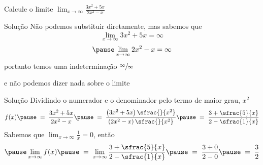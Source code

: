 \begin{question}
Calcule o limite
\(
  \lim_{x \to \infty} \frac{3x^2 + 5x}{2x^2 - x}
\)
\end{question}

\begin{resolution}{Solução}
  Não podemos substituir diretamente,
  \pause
  mas sabemos que
  \pause
  \[
    \lim_{x \to \infty} 3x^2 + 5x = \infty
  \]
  \[
    \pause
    \lim_{x \to \infty} 2x^2 - x = \infty
  \]
  \pause
  portanto temos uma indeterminação \(\sfrac{\infty}{\infty}\)

  \pause
  e não podemos dizer nada sobre o limite
\end{resolution}

\begin{resolution}{Solução}
  Dividindo o numerador e o denominador pelo termo de maior grau, $x^2$
  \pause
  \[
    f(x)
    \pause
    \;=\; \frac{3x^2 + 5x}{2x^2 - x}
    \pause
    \;=\; \frac{\left(3x^2 + 5x\right)\sfrac{}{x^2}}{\left(2x^2 - x\right)\sfrac{}{x^2}}
    \pause
    \;=\; \frac{3 + \sfrac{5}{x}}{2 - \sfrac{1}{x}}
  \]
  \pause
  Sabemos que
  \(
    \lim_{x\to\infty} \frac{1}{x} = 0
  \),
  \pause
  então
  \[
    \pause
    \lim_{x\to\infty} f(x)
    \pause
    \;=\; \lim_{x\to\infty} \frac{3 + \sfrac{5}{x}}{2 - \sfrac{1}{x}}
    \pause
    \;=\; \frac{3 + 0}{2 - 0}
    \pause
    \;=\; \frac{3}{2}
  \]
\end{resolution}

